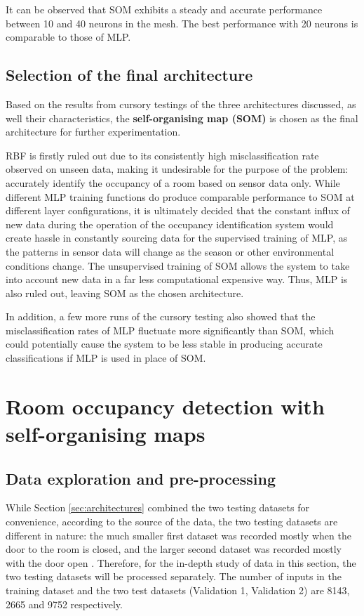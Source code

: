 \documentclass[10pt, oneside]{article}
\begin{document}
It can be observed that SOM exhibits a steady and accurate performance between 10 and 40 neurons in the mesh. The best performance with 20 neurons is comparable to those of MLP.

\subsection{Selection of the final architecture}

Based on the results from cursory testings of the three architectures discussed, as well their characteristics, the \textbf{self-organising map (SOM)} is chosen as the final architecture for further experimentation. 

RBF is firstly ruled out due to its consistently high misclassification rate observed on unseen data, making it undesirable for the purpose of the problem: accurately identify the occupancy of a room based on sensor data only. While different MLP training functions do produce comparable performance to SOM at different layer configurations, it is ultimately decided that the constant influx of new data during the operation of the occupancy identification system would create hassle in constantly sourcing data for the supervised training of MLP, as the patterns in sensor data will change as the season or other environmental conditions change. The unsupervised training of SOM allows the system to take into account new data in a far less computational expensive way. Thus, MLP is also ruled out, leaving SOM as the chosen architecture.

In addition, a few more runs of the cursory testing also showed that the misclassification rates of MLP fluctuate more significantly than SOM, which could potentially cause the system to be less stable in producing accurate classifications if MLP is used in place of SOM. 

\section{Room occupancy detection with self-organising maps} \label{sec:som-occupancy-detection}

\subsection{Data exploration and pre-processing} \label{subsec:preprocessing}
While Section \ref{sec:architectures} combined the two testing datasets for convenience, according to the source of the data, the two testing datasets are different in nature: the much smaller first dataset was recorded mostly when the door to the room is closed, and the larger second dataset was recorded mostly with the door open \cite[Tb. 5]{candanedo2016accurate}. Therefore, for the in-depth study of data in this section, the two testing datasets will be processed separately. The number of inputs in the training dataset and the two test datasets (Validation 1, Validation 2) are 8143, 2665 and 9752 respectively.
\end{document}
